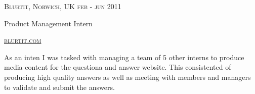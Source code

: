 {
  \textsc{\small{Blurtit, Norwich, UK
    \hfill
      {\raggedleft
        feb - jun 2011
      } \\
    }
  }
  {\raggedright\large {
    Product Management Intern
  } \\}

  \textsc{\small\href{http://www.blurtit.com}{blurtit.com}}

  \normalsize{\raggedright
    As an inten I was tasked with managing a team of 5 other interns to produce media content for the questiona and answer website. This consistented of producing high quality answers as well as meeting with members and managers to validate and submit the answers. 
  }
}
